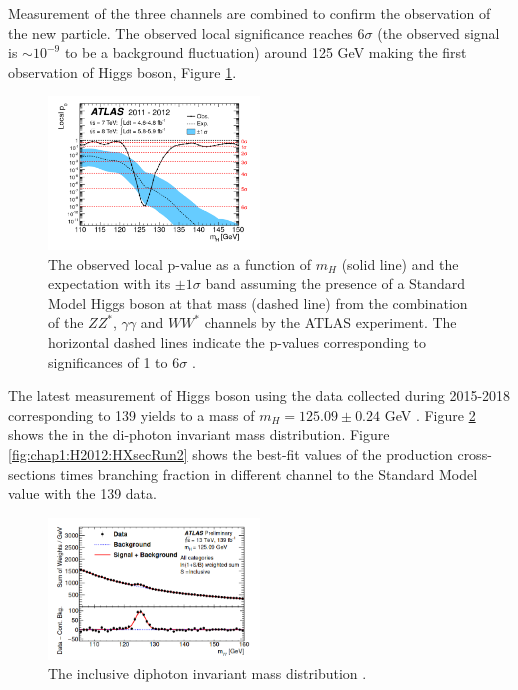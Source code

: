 Measurement of the three channels are combined to confirm the observation of the new particle. The observed local significance reaches $6\sigma$ (the observed signal is $\sim10^{-9}$ to be a background fluctuation) around 125 GeV making the first observation of Higgs boson, Figure \ref{fig:chap1:H2012:P0}.  
\begin{figure}[htbp]
    \centering
    \includegraphics[width=0.5\textwidth]{Ch1/Img/Hp0.png}
    \caption{The observed local p-value as a function of $m_H$ (solid line) and the expectation with its $\pm1\sigma$ band assuming the presence of a Standard Model Higgs boson at that mass (dashed line) from the combination of the $ZZ^*$, $\gamma\gamma$ and $WW^*$ channels by the ATLAS experiment. The horizontal dashed lines indicate the p-values corresponding to significances of 1 to 6$\sigma$ \cite{ATLAS_2012}.}
    \label{fig:chap1:H2012:P0}
\end{figure}
The latest measurement of Higgs boson using the data collected during 2015-2018 corresponding to 139 \ifb yields to a  mass of $m_{H}=125.09\pm0.24 $ GeV \cite{Mass}. Figure \ref{fig:chap1:H2012:MyyRun2} shows the in the di-photon invariant mass distribution. Figure \ref{fig:chap1:H2012:HXsecRun2} shows the best-fit values of the production cross-sections times branching fraction in different channel to the Standard Model value with the 139 \ifb data.\\
\begin{figure}[htbp]
    \centering
    \includegraphics[width=0.5\textwidth]{Ch1/Img/myy_run2.png}
    \caption{The inclusive diphoton invariant mass distribution \cite{ATLAS_2020}.}
    \label{fig:chap1:H2012:MyyRun2}
\end{figure}

